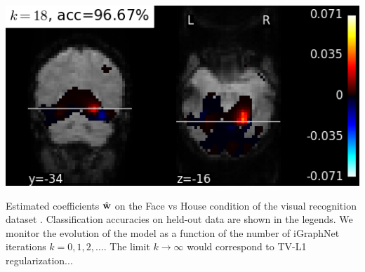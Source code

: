 \begin{marginfigure}
\includegraphics[width=1\linewidth]{figures/haxby_igraphnet_w_18_yz.png}
\caption{Estimated coefficients $\hat{\mathbf{w}}$ on the Face vs House condition
      of the visual recognition dataset \citep{haxby2001}.
Classification accuracies on held-out data are shown in the
legends. We monitor the evolution of the model as a function of the number of iGraphNet iterations $k = 0, 1, 2,\ldots$. The limit $k \rightarrow \infty$ would correspond to TV-L1 regularization...
}
\vspace{.5cm}
\label{fig:igraphnet}
\end{marginfigure}

